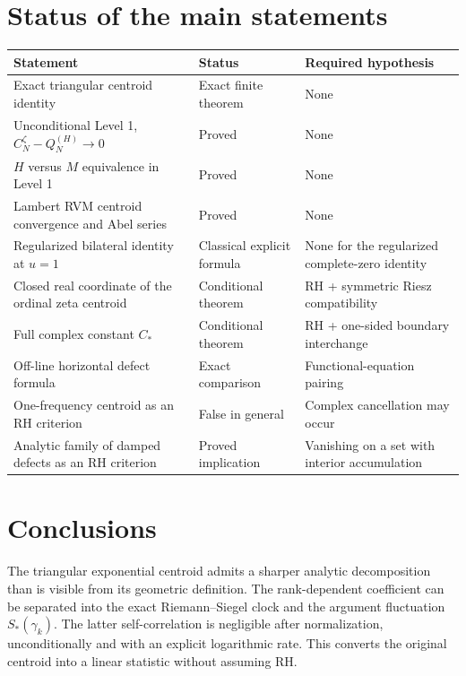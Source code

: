 \documentclass[11pt]{article}
\theoremstyle{definition}
\theoremstyle{remark}
\begin{document}
\section{Status of the main statements}

\begin{center}
\begin{tabular}{p{}p{}p{}}
\toprule
Statement & Status & Required hypothesis \\
\midrule
Exact triangular centroid identity & Exact finite theorem & None \\
Unconditional Level 1, $C_N^{\zeta}-Q_N^{(H)}\to0$ & Proved & None \\
$H$ versus $M$ equivalence in Level 1 & Proved & None \\
Lambert RVM centroid convergence and Abel series & Proved & None \\
Regularized bilateral identity at $u=1$ & Classical explicit formula & None for the regularized complete-zero identity \\
Closed real coordinate of the ordinal zeta centroid & Conditional theorem & RH + symmetric Riesz compatibility \\
Full complex constant $C_*$ & Conditional theorem & RH + one-sided boundary interchange \\
Off-line horizontal defect formula & Exact comparison & Functional-equation pairing \\
One-frequency centroid as an RH criterion & False in general & Complex cancellation may occur \\
Analytic family of damped defects as an RH criterion & Proved implication & Vanishing on a set with interior accumulation \\
\bottomrule
\end{tabular}
\end{center}

\section{Conclusions}

The triangular exponential centroid admits a sharper analytic decomposition than is visible from its geometric definition.  The rank-dependent coefficient can be separated into the exact Riemann--Siegel clock and the argument fluctuation $S_*(\gamma_k)$.  The latter self-correlation is negligible after normalization, unconditionally and with an explicit logarithmic rate.  This converts the original centroid into a linear statistic without assuming RH.
\end{document}
